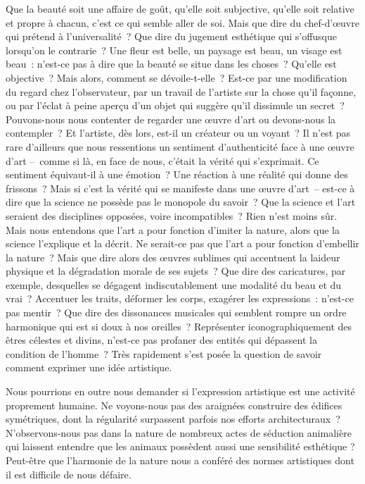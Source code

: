 \documentclass[
  10pt,
  french,
  a5paper,
  openany]{book}
\begin{document}
Que la beauté soit une affaire de goût, qu'elle soit subjective, qu'elle soit relative et propre à chacun, c'est ce qui semble aller de soi. Mais que dire du chef-d'œuvre qui prétend à l'universalité~? Que dire du jugement esthétique qui s'offusque lorsqu'on le contrarie~? Une fleur est belle, un paysage est beau, un visage est beau~: n'est-ce pas à dire que la beauté se situe dans les choses~? Qu'elle est objective~? Mais alors, comment se dévoile-t-elle~? Est-ce par une modification du regard chez l'observateur, par un travail de l'artiste sur la chose qu'il façonne, ou par l'éclat à peine aperçu d'un objet qui suggère qu'il dissimule un secret~? Pouvons-nous nous contenter de regarder une œuvre d'art ou devons-nous la contempler~? Et l'artiste, dès lors, est-il un créateur ou un voyant~? Il n'est pas rare d'ailleurs que nous ressentions un sentiment d'authenticité face à une œuvre d'art --~comme si là, en face de nous, c'était la vérité qui s'exprimait. Ce sentiment équivaut-il à une émotion~? Une réaction à une réalité qui donne des frissons~? Mais si c'est la vérité qui se manifeste dans une œuvre d'art~-- est-ce à dire que la science ne possède pas le monopole du savoir~? Que la science et l'art seraient des disciplines opposées, voire incompatibles~? Rien n'est moins sûr. Mais nous entendons que l'art a pour fonction d'imiter la nature, alors que la science l'explique et la décrit. Ne serait-ce pas que l'art a pour fonction d'embellir la nature~? Mais que dire alors des œuvres sublimes qui accentuent la laideur physique et la dégradation morale de ses sujets~? Que dire des caricatures, par exemple, desquelles se dégagent indiscutablement une modalité du beau et du vrai~? Accentuer les traits, déformer les corps, exagérer les expressions~: n'est-ce pas mentir~? Que dire des dissonances musicales qui semblent rompre un ordre harmonique qui est si doux à nos oreilles~? Représenter iconographiquement des êtres célestes et divins, n'est-ce pas profaner des entités qui dépassent la condition de l'homme~? Très rapidement s'est posée la question de savoir comment exprimer une idée artistique.

Nous pourrions en outre nous demander si l'expression artistique est une activité proprement humaine. Ne voyons-nous pas des araignées construire des édifices symétriques, dont la régularité surpassent parfois nos efforts architecturaux~? N'observons-nous pas dans la nature de nombreux actes de séduction animalière qui laissent entendre que les animaux possèdent aussi une sensibilité esthétique ? Peut-être que l'harmonie de la nature nous a conféré des normes artistiques dont il est difficile de nous défaire.
\end{document}
